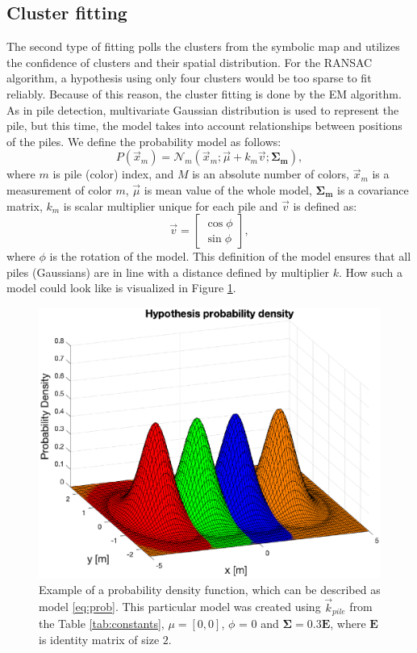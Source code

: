\subsection{Cluster fitting}
The second type of fitting polls the clusters from the symbolic map and utilizes the confidence of clusters and their spatial distribution. For the RANSAC algorithm, a hypothesis using only four clusters would be too sparse to fit reliably. Because of this reason, the cluster fitting is done by the EM algorithm. As in pile detection, multivariate Gaussian distribution is used to represent the pile, but this time, the model takes into account relationships between positions of the piles. We define the probability model as follows:
\begin{equation}
P(\vec{x}_m) = \mathcal{N}_m(\vec{x}_m; \vec{\mu} + k_m\vec{v}; \bm{\Sigma_m}),
\label{eq:prob}
\end{equation}
where $m$ is pile (color) index, and $M$ is an absolute number of colors, $\vec{x}_m$ is a measurement of color $m$, $\vec{\mu}$ is mean value of the whole model, $\bm{\Sigma_m}$ is a covariance matrix, $k_m$ is scalar multiplier unique for each pile and $\vec{v}$ is defined as:
\begin{equation}
\vec{v} = \begin{bmatrix}
\cos \phi \\
\sin \phi
\end{bmatrix},
\end{equation}
where $\phi$ is the rotation of the model. This definition of the model ensures that all piles (Gaussians) are in line with a distance defined by multiplier $k$. How such a model could look like is visualized in Figure \ref{fig:mnd}.

\begin{figure}[H]
	\centering
	\includegraphics[scale=0.55]{fig/model_mnd.eps}
	\caption[Model of piles]{Example of a probability density function, which can be described as model \ref{eq:prob}. This particular model was created using $\vec{k}_{pile}$ from the Table \ref{tab:constants}, $\mu = [0, 0]$, $\phi$ = 0 and $\bm{\Sigma} = 0.3\bm{E}$, where $\bm{E}$ is identity matrix of size $2$.}
	\label{fig:mnd}
\end{figure}


